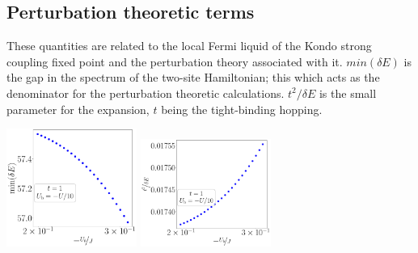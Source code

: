 \documentclass{report}
\numberwithin{equation}{section}
\begin{document}
\subsection*{Perturbation theoretic terms}
These quantities are related to the local Fermi liquid of the Kondo strong coupling fixed point and the perturbation theory associated with it. \(min(\delta E)\) is the gap in the spectrum of the two-site Hamiltonian; this which acts as the denominator for the perturbation theoretic calculations. \(t^2/\delta E\) is the small parameter for the expansion, \(t\) being the tight-binding hopping. 
\begin{center}
	\includegraphics[width=0.32\textwidth]{../figures/gap-D=1000.00000,t=1.00000,J=30.00000,V=1.50000J,Ub=-Uby10,N=4,U=59.85787,93.55363,25.pdf}
	\includegraphics[width=0.32\textwidth]{../figures/par-D=1000.00000,t=1.00000,J=30.00000,V=1.50000J,Ub=-Uby10,N=4,U=59.85787,93.55363,25.pdf}
\end{center}
\end{document}
